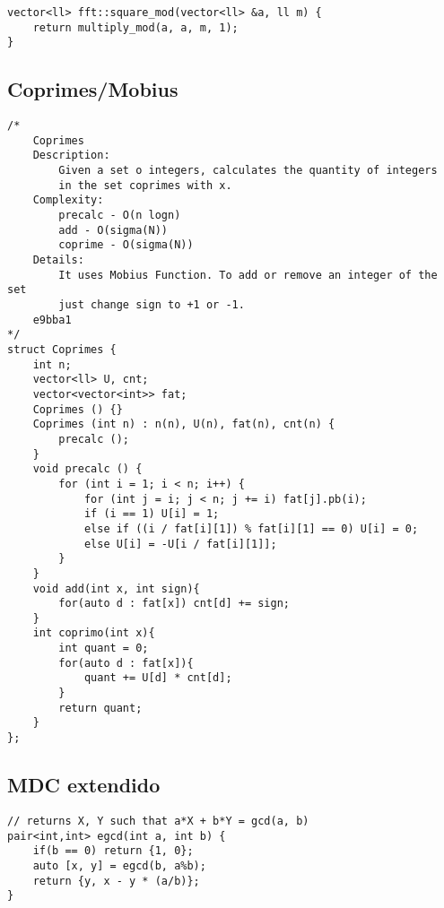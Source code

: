 \documentclass{article}
\begin{document}
\begin{verbatim}
vector<ll> fft::square_mod(vector<ll> &a, ll m) {
    return multiply_mod(a, a, m, 1);
}\end{verbatim}
\subsection{Coprimes/Mobius}
\begin{verbatim}
/*
    Coprimes
    Description: 
        Given a set o integers, calculates the quantity of integers
        in the set coprimes with x.
    Complexity: 
        precalc - O(n logn)
        add - O(sigma(N))
        coprime - O(sigma(N))
    Details:
        It uses Mobius Function. To add or remove an integer of the set
        just change sign to +1 or -1.
    e9bba1
*/
struct Coprimes {
    int n;
    vector<ll> U, cnt;
    vector<vector<int>> fat;
    Coprimes () {}
    Coprimes (int n) : n(n), U(n), fat(n), cnt(n) {
        precalc ();
    }
    void precalc () {
        for (int i = 1; i < n; i++) {
            for (int j = i; j < n; j += i) fat[j].pb(i); 
            if (i == 1) U[i] = 1;
            else if ((i / fat[i][1]) % fat[i][1] == 0) U[i] = 0;
            else U[i] = -U[i / fat[i][1]];
        }
    }
    void add(int x, int sign){
        for(auto d : fat[x]) cnt[d] += sign;
    }
    int coprimo(int x){
        int quant = 0;
        for(auto d : fat[x]){
            quant += U[d] * cnt[d];
        }
        return quant;
    }
};\end{verbatim}
\subsection{MDC extendido}
\begin{verbatim}
// returns X, Y such that a*X + b*Y = gcd(a, b)
pair<int,int> egcd(int a, int b) {
	if(b == 0) return {1, 0};
	auto [x, y] = egcd(b, a%b);
	return {y, x - y * (a/b)};
}
\end{verbatim}
\end{document}
